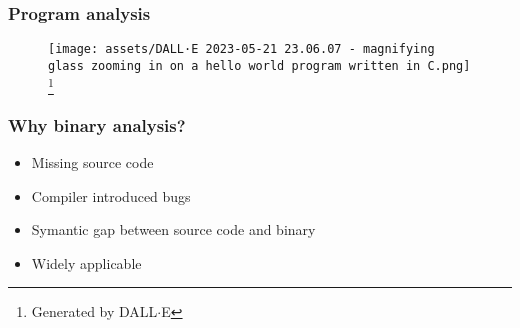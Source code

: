 \begin{frame}

    \frametitle{Program analysis}
    \begin{figure}
    \texttt{[image: assets/DALL·E 2023-05-21 23.06.07 - magnifying glass zooming in on a hello world program written in C.png]}
    \footnote{\tiny Generated by DALL$\cdot$E}
    \end{figure}
\end{frame}

\begin{frame}

    \frametitle{Why binary analysis?}
    \begin{itemize}
        \item Missing source code
        \item Compiler introduced bugs
        \item Symantic gap between source code and binary
        \item Widely applicable
    \end{itemize}
\end{frame}
